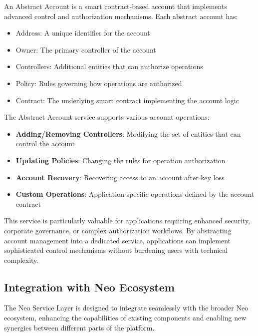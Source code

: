 \begin{definition}
An Abstract Account is a smart contract-based account that implements advanced control and authorization mechanisms. Each abstract account has:
\begin{itemize}
    \item Address: A unique identifier for the account
    \item Owner: The primary controller of the account
    \item Controllers: Additional entities that can authorize operations
    \item Policy: Rules governing how operations are authorized
    \item Contract: The underlying smart contract implementing the account logic
\end{itemize}
\end{definition}

The Abstract Account service supports various account operations:

\begin{itemize}
    \item \textbf{Adding/Removing Controllers}: Modifying the set of entities that can control the account
    \item \textbf{Updating Policies}: Changing the rules for operation authorization
    \item \textbf{Account Recovery}: Recovering access to an account after key loss
    \item \textbf{Custom Operations}: Application-specific operations defined by the account contract
\end{itemize}

This service is particularly valuable for applications requiring enhanced security, corporate governance, or complex authorization workflows. By abstracting account management into a dedicated service, applications can implement sophisticated control mechanisms without burdening users with technical complexity.

\subsection{Integration with Neo Ecosystem}
\label{subsec:nsl-integration}

The Neo Service Layer is designed to integrate seamlessly with the broader Neo ecosystem, enhancing the capabilities of existing components and enabling new synergies between different parts of the platform.

